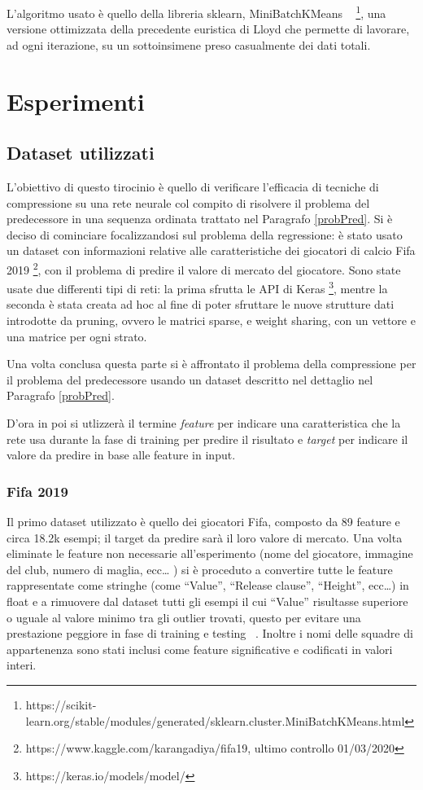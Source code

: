 \documentclass[12pt]{report}
\begin{document}
L’algoritmo usato è quello della libreria sklearn, MiniBatchKMeans ~\cite{KMeansMiniBatch} \footnote{https://scikit-learn.org/stable/modules/generated/sklearn.cluster.MiniBatchKMeans.html}, una versione ottimizzata della precedente euristica di Lloyd che permette di lavorare, ad ogni iterazione, su un sottoinsimene preso casualmente dei dati totali.


\chapter{Esperimenti}

\section{Dataset utilizzati}
L'obiettivo di questo tirocinio è quello di verificare l'efficacia di tecniche di compressione su una rete neurale col compito di risolvere il problema del predecessore in una sequenza ordinata trattato nel Paragrafo \ref{probPred}.
Si è deciso di cominciare focalizzandosi sul problema della regressione: è stato usato un dataset con informazioni relative alle caratteristiche dei giocatori di calcio Fifa 2019 \footnote{https://www.kaggle.com/karangadiya/fifa19, ultimo controllo 01/03/2020}, con il problema di predire il valore di mercato del giocatore. Sono state usate due differenti tipi di reti: la prima sfrutta le API di Keras \footnote{https://keras.io/models/model/}, mentre la seconda è stata creata ad hoc al fine di poter sfruttare le nuove strutture dati introdotte da pruning, ovvero le matrici sparse, e weight sharing, con un vettore e una matrice per ogni strato.

Una volta conclusa questa parte si è affrontato il problema della compressione per il problema del predecessore usando un dataset descritto nel dettaglio nel Paragrafo \ref{probPred}.

D'ora in poi si utlizzerà il termine \textit{feature} per indicare una caratteristica che la rete usa durante la fase di training per predire il risultato e \textit{target} per indicare il valore da predire in base alle feature in input.

\subsection{Fifa 2019}

Il primo dataset utilizzato è quello dei giocatori Fifa, composto da 89 feature e circa 18.2k esempi; il target da predire sarà il loro valore di mercato.
Una volta eliminate le feature non necessarie all’esperimento (nome del giocatore, immagine del club, numero di maglia, ecc… ) si è proceduto a convertire tutte le feature rappresentate come stringhe (come ``Value'', ``Release clause'', ``Height'', ecc…) in float e a rimuovere dal dataset tutti gli esempi il cui ``Value'' risultasse superiore o uguale al valore minimo tra gli outlier trovati, questo per evitare una prestazione peggiore in fase di training e testing ~\cite{Outlier}. Inoltre i nomi delle squadre di appartenenza sono stati inclusi come feature significative e codificati in valori interi.
\end{document}
